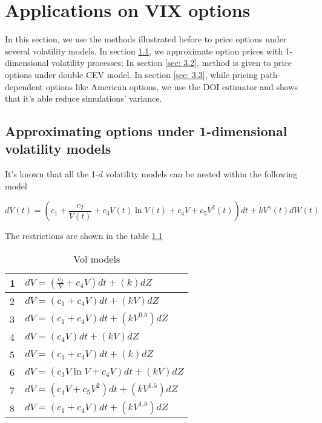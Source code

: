 \chapter{Applications on VIX options}

In this section, we use the methods illustrated before to price options under several volatility models. In section \ref{sec: 3.1}, we approximate option prices with 1-dimensional volatility processes; In section \ref{sec: 3.2}, method is given to price options under double CEV model. In section \ref{sec: 3.3}, while pricing path-dependent options like American options, we use the DOI estimator and shows that it's able reduce simulations' variance.

\section{Approximating options under 1-dimensional volatility models}
\label{sec: 3.1}

It's known that all the 1-$d$ volatility models can be nested within the following model

\begin{equation}
    d V(t)=\left(c_{1}+\frac{c_{2}}{V(t)}+c_{3} V(t) \ln V(t)+c_{4} V+c_{5} V^{2}(t)\right) d t+k V^{\gamma}(t) dW(t)
\end{equation}

\noindent The restrictions are shown in the table \ref{tabe 3.1}

\begin{table}
    \begin{center}
        \begin{tabular}{|m{1cm}|l|}
            \hline 1 & $d V=\left(\frac{c_{2}}{V}+c_{4} V\right) d t+(k) d Z$ \\
            \hline 2 & $d V=\left(c_{1}+c_{4} V\right) d t+(k V) d Z$ \\
            \hline 3 & $d V=\left(c_{1}+c_{4} V\right) d t+\left(k V^{0.5}\right) d Z$ \\
            \hline 4 & $d V=\left(c_{4} V\right) d t+(k V) d Z$ \\
            \hline 5 & $d V=\left(c_{1}+c_{4} V\right) d t+(k) d Z$ \\
            \hline 6 & $d V=\left(c_{3} V \ln V+c_{4} V\right) d t+(k V) d Z$ \\
            \hline 7 & $d V=\left(c_{4} V+c_{5} V^{2}\right) d t+\left(k V^{1.5}\right) d Z$ \\
            \hline 8 & $d V=\left(c_{1}+c_{4} V\right) d t+\left(k V^{1.5}\right) d Z$ \\
            \hline
        \end{tabular}
    \end{center}
    \caption{Vol models}
    \label{tabe 3.1}
\end{table}

